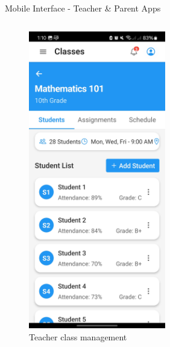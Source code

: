 \documentclass[aspectratio=169]{beamer}
\begin{document}
\begin{frame}{Mobile Interface - Teacher \& Parent Apps}
    \begin{columns}
        \begin{figure}
            \includegraphics[width=0.7\textwidth,height=0.6\textheight,keepaspectratio]{../pfe-pics/Mobile /Teacher/Screenshot_20250610_131013_Expo Go.jpg}
            \caption{Teacher class management}
        \end{figure}
        \begin{figure}

\end{figure}
\end{columns}
\end{frame}
\end{document}
